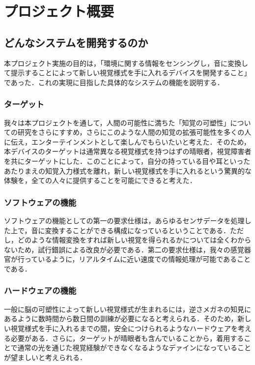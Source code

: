 \section{プロジェクト概要}
\subsection{どんなシステムを開発するのか}
本プロジェクト実施の目的は，「環境に関する情報をセンシングし，音に変換して提示することによって新しい視覚様式を手に入れるデバイスを開発すること」であった．これの実現に目指した具体的なシステムの機能を説明する．
\subsubsection{ターゲット}
我々は本プロジェクトを通して，人間の可能性に満ちた「知覚の可塑性」についての研究をさらにすすめ，さらにこのような人間の知覚の拡張可能性を多くの人に伝え，エンターテインメントとして楽しんでもらいたいと考えた．そのため，本デバイスのターゲットは通常異なる視覚様式を持つはずの晴眼者，視覚障害者を共にターゲットにした．このことによって，自分の持っている目や耳といったあたりまえの知覚入力様式を離れ，新しい視覚様式を手に入れるという驚異的な体験を，全ての人々に提供することを可能にできると考えた．
\subsubsection{ソフトウェアの機能}
ソフトウェアの機能としての第一の要求仕様は，あらゆるセンサデータを処理した上で，音に変換することができる構成になっているということである．ただし，どのような情報変換をすれば新しい視覚を得られるかについては全くわからないため，試行錯誤による改良が必要である．第二の要求仕様は，我々の感覚器官が行っているように，リアルタイムに近い速度での情報処理が可能であることである．
\subsubsection{ハードウェアの機能}
一般に脳の可塑性によって新しい視覚様式が生まれるには，逆さメガネの知見にあるように数時間から数日間の訓練が必要になると考えられる．そのため，新しい視覚様式を手に入れるまでの間，安全につけられるようなハードウェアを考える必要がある．さらに，ターゲットが晴眼者も含んでいることから，着用することで通常の光を通じた視覚経験ができなくなるようなデァインになっていることが望ましいと考えられる．
